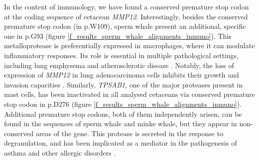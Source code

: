 In the context of immunology, we have found a conserved premature stop codon at the coding sequence of cetacean \textit{MMP12}.
Interestingly, besides the conserved premature stop codon (in {p.W109}), sperm whale present an additional, specific one in {p.G93} (figure \ref{f_results_sperm_whale_alignments_inmuno}).
This metalloprotease is preferentially expressed in macrophages, where it can modulate inflammatory responses.
Its role is essential in multiple pathological settings, including lung emphysema \cite{Ishii2014} and atherosclerotic disease \cite{Proietta2014}.
Notably, the loss of expression of \textit{MMP12} in lung adenocarcinoma cells inhibits their growth and invasion capacities \cite{Lv2015}.
Similarly, \textit{TPSAB1}, one of the major proteases present in mast cells, has been inactivated in all analysed cetaceans via conserved premature stop codon in {p.D276} (figure \ref{f_results_sperm_whale_alignments_inmuno}).
Additional premature stop codons, both of them independently arisen, can be found in the sequences of sperm whale and minke whale, but they appear in non-conserved areas of the gene.
This protease is secreted in the response to degranulation, and has been implicated as a mediator in the pathogenesis of asthma and other allergic disorders \cite{Abdelmotelb2014}.

